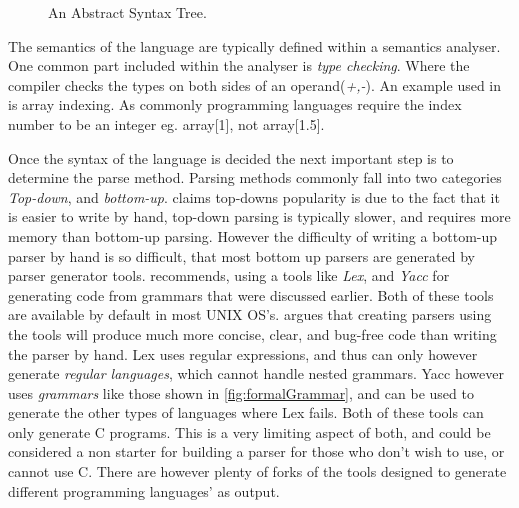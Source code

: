 \begin{figure}[ht!]
    \centering
    \caption{An Abstract Syntax Tree.}
    \label{fig:AST}
\end{figure}

The semantics of the language are typically defined within a semantics analyser. One common part included within the analyser is \emph{type checking}. Where the compiler checks the types on both sides of an operand(\emph{+,-}). An example used in \cite{DragonBook} is array indexing. As commonly programming languages require the index number to be an integer eg. array[1], not array[1.5].

Once the syntax of the language is decided the next important step is to determine the parse method. Parsing methods commonly fall into two categories \emph{Top-down}, and \emph{bottom-up}. \cite{DragonBook} claims top-downs popularity is due to the fact that it is easier to write by hand, top-down parsing is typically slower, and requires more memory than bottom-up parsing. However the difficulty of writing a bottom-up parser by hand is so difficult, that most bottom up parsers are generated by parser generator tools.
\newpage
\cite{DragonBook} recommends, using a tools like \emph{Lex}, and \emph{Yacc} for generating code from grammars that were discussed earlier. Both of these tools are available by default in most UNIX OS's. \cite{LexYacc} argues that creating parsers using the tools will produce much more concise, clear, and bug-free code than writing the parser by hand. Lex uses regular expressions, and thus can only however generate \emph{regular languages}, which cannot handle nested grammars. Yacc however uses \emph{grammars} like those shown in \ref{fig:formalGrammar}, and can be used to generate the other types of languages where Lex fails. Both of these tools can only generate C programs. This is a very limiting aspect of both, and could be considered a non starter for building a parser for those who don't wish to use, or cannot use C. There are however plenty of forks of the tools designed to generate different programming languages' as output.


